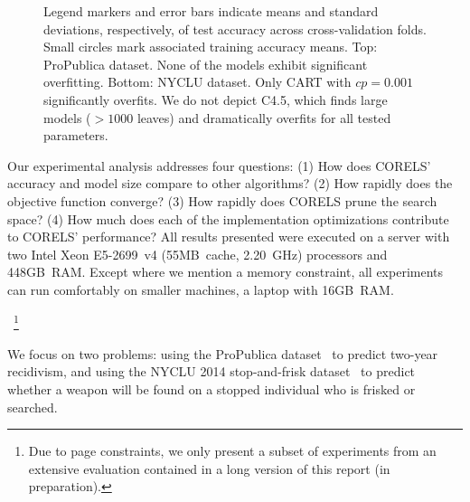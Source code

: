 \begin{figure}[t!]
{%
%
Legend markers and error bars indicate means and standard deviations,
respectively, of test accuracy across cross-validation folds.
%
Small circles mark associated training accuracy means.
%
Top:  %
ProPublica dataset.
%
None of the models exhibit significant overfitting.
%
Bottom:  %
NYCLU dataset.
%
Only CART with ${cp = 0.001}$ significantly overfits.
%
We do not depict C4.5, which finds large models (${>1000}$ leaves)
and dramatically overfits for all tested parameters.
}
\label{fig:sparsity}
\end{figure}


Our experimental analysis addresses four questions:
(1) How does CORELS' accuracy and model size compare to other algorithms?
(2) How rapidly does the objective function converge?
(3) How rapidly does CORELS prune the search space?
(4) How much does each of the implementation optimizations contribute to CORELS' performance?
%
All results presented were executed on a server with two Intel Xeon E5-2699~v4
(55MB~cache, 2.20~GHz) processors and 448GB~RAM.
%
Except where we mention a memory constraint, all experiments
can run comfortably on smaller machines, \eg a laptop with 16GB~RAM.\begin{kdd}
~\footnote{Due to page constraints, we only present a subset of experiments from
an extensive evaluation contained in a long version of this report (in preparation).}
\end{kdd}
%
We focus on two problems:
using the ProPublica dataset~\cite{LarsonMaKiAn16} to predict two-year recidivism,
and using the NYCLU 2014 stop-and-frisk dataset~\cite{nyclu:2014} to predict
whether a weapon will be found on a stopped individual who is frisked or searched.

